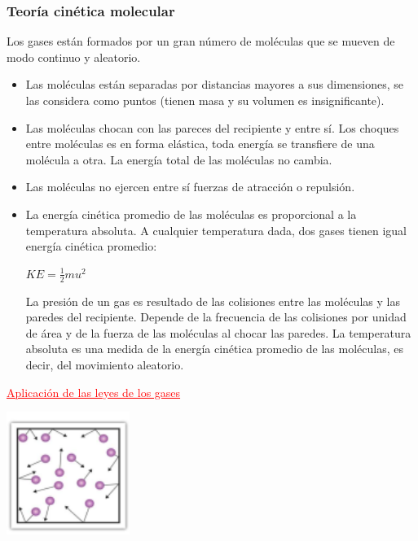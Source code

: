         \subsubsection{Teoría cinética molecular}
            \sangria{} Los gases están formados por un gran número de moléculas que se mueven de modo continuo y aleatorio.
            \saltoPag{}
            \begin{itemize}
                \item Las moléculas están separadas por distancias mayores a sus dimensiones, se las considera como puntos (tienen masa y su volumen es insignificante).
                \item Las moléculas chocan con las pareces del recipiente y entre sí. Los choques entre moléculas es en forma elástica, toda energía se transfiere de una molécula a otra. La energía total de las moléculas no cambia.
                \item Las moléculas no ejercen entre sí fuerzas de atracción o repulsión.
                \item La energía cinética promedio de las moléculas es proporcional a la temperatura absoluta. A cualquier temperatura dada, dos gases tienen igual energía cinética promedio:
                \begin{center} $KE = \frac{1}{2} m u^2$ \end{center}
                \sangria{} La presión de un gas es resultado de las colisiones entre las moléculas y las paredes del recipiente. Depende de la frecuencia de las colisiones por unidad de área y de la fuerza de las moléculas al chocar las paredes. La temperatura absoluta es una medida de la energía cinética promedio de las moléculas, es decir, del movimiento aleatorio.
            \end{itemize}
            \begin{center} \textcolor{red}{\underline{Aplicación de las leyes de los gases}} \end{center}
            \begin{center} \includegraphics[width=4cm]{./imagenes/colisionesParticulas.png} \end{center}
